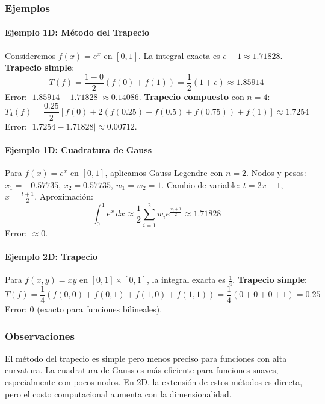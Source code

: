 \documentclass[11pt]{book}
\theoremstyle{definicion}
\theoremstyle{teorema}
\theoremstyle{ejemplo}
\begin{document}
\subsubsection{Ejemplos}

\paragraph{Ejemplo 1D: Método del Trapecio}
Consideremos \( f(x) = e^x \) en \([0, 1]\). La integral exacta es \( e - 1 \approx 1.71828 \).
\textbf{Trapecio simple}:
  \[
  T(f) = \frac{1 - 0}{2} (f(0) + f(1)) = \frac{1}{2} (1 + e) \approx 1.85914
  \]
Error: \( |1.85914 - 1.71828| \approx 0.14086 \).
\textbf{Trapecio compuesto} con \( n = 4 \):
  \[
  T_4(f) = \frac{0.25}{2} \left[ f(0) + 2(f(0.25) + f(0.5) + f(0.75)) + f(1) \right] \approx 1.7254
  \]
Error: \( |1.7254 - 1.71828| \approx 0.00712 \).

\paragraph{Ejemplo 1D: Cuadratura de Gauss}
Para \( f(x) = e^x \) en \([0, 1]\), aplicamos Gauss-Legendre con \( n = 2 \).
Nodos y pesos: \( x_1 = -0.57735 \), \( x_2 = 0.57735 \), \( w_1 = w_2 = 1 \).
Cambio de variable: \( t = 2x - 1 \), \( x = \frac{t + 1}{2} \).
Aproximación:
  \[
  \int_{0}^{1} e^x \, dx \approx \frac{1}{2} \sum_{i=1}^{2} w_i e^{\frac{x_i + 1}{2}} \approx 1.71828
  \]
Error: \( \approx 0 \). %

\paragraph{Ejemplo 2D: Trapecio}
Para \( f(x, y) = xy \) en \([0, 1] \times [0, 1]\), la integral exacta es \( \frac{1}{4} \).
\textbf{Trapecio simple}:
  \[
  T(f) = \frac{1}{4} (f(0,0) + f(0,1) + f(1,0) + f(1,1)) = \frac{1}{4} (0 + 0 + 0 + 1) = 0.25
  \]
Error: \( 0 \) (exacto para funciones bilineales).

\subsubsection{Observaciones} 
\noindent
El método del trapecio es simple pero menos preciso para funciones con alta curvatura.
La cuadratura de Gauss es más eficiente para funciones suaves, especialmente con pocos nodos.
En 2D, la extensión de estos métodos es directa, pero el costo computacional aumenta con la dimensionalidad.
\end{document}
